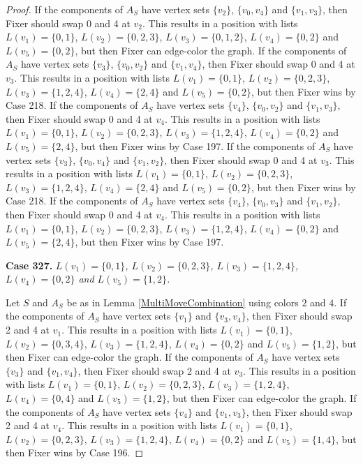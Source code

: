 \documentclass[12pt]{amsart}
\theoremstyle{plain}
\theoremstyle{definition}
\theoremstyle{remark}
\begin{document}
\begin{proof}
If the components of $A_S$ have vertex sets $\{v_2\}$, $\{v_0, v_4\}$ and $\{v_1, v_3\}$, then Fixer should swap 0 and 4 at $v_2$. This results in a position with lists $L(v_1) = \{0, 1\}$, $L(v_2) = \{0, 2, 3\}$, $L(v_3) = \{0, 1, 2\}$, $L(v_4) = \{0, 2\}$ and $L(v_5) = \{0, 2\}$, but then Fixer can edge-color the graph. If the components of $A_S$ have vertex sets $\{v_3\}$, $\{v_0, v_2\}$ and $\{v_1, v_4\}$, then Fixer should swap 0 and 4 at $v_3$. This results in a position with lists $L(v_1) = \{0, 1\}$, $L(v_2) = \{0, 2, 3\}$, $L(v_3) = \{1, 2, 4\}$, $L(v_4) = \{2, 4\}$ and $L(v_5) = \{0, 2\}$, but then Fixer wins by Case 218. If the components of $A_S$ have vertex sets $\{v_4\}$, $\{v_0, v_2\}$ and $\{v_1, v_3\}$, then Fixer should swap 0 and 4 at $v_4$. This results in a position with lists $L(v_1) = \{0, 1\}$, $L(v_2) = \{0, 2, 3\}$, $L(v_3) = \{1, 2, 4\}$, $L(v_4) = \{0, 2\}$ and $L(v_5) = \{2, 4\}$, but then Fixer wins by Case 197. If the components of $A_S$ have vertex sets $\{v_3\}$, $\{v_0, v_4\}$ and $\{v_1, v_2\}$, then Fixer should swap 0 and 4 at $v_3$. This results in a position with lists $L(v_1) = \{0, 1\}$, $L(v_2) = \{0, 2, 3\}$, $L(v_3) = \{1, 2, 4\}$, $L(v_4) = \{2, 4\}$ and $L(v_5) = \{0, 2\}$, but then Fixer wins by Case 218. If the components of $A_S$ have vertex sets $\{v_4\}$, $\{v_0, v_3\}$ and $\{v_1, v_2\}$, then Fixer should swap 0 and 4 at $v_4$. This results in a position with lists $L(v_1) = \{0, 1\}$, $L(v_2) = \{0, 2, 3\}$, $L(v_3) = \{1, 2, 4\}$, $L(v_4) = \{0, 2\}$ and $L(v_5) = \{2, 4\}$, but then Fixer wins by Case 197. 

\noindent\textbf{Case 327.  }\textit{$L(v_1) = \{0, 1\}$, $L(v_2) = \{0, 2, 3\}$, $L(v_3) = \{1, 2, 4\}$, $L(v_4) = \{0, 2\}$ and $L(v_5) = \{1, 2\}$.}

Let $S$ and $A_S$ be as in Lemma \ref{MultiMoveCombination} using colors $2$ and $4$. If the components of $A_S$ have vertex sets $\{v_1\}$ and $\{v_3, v_4\}$, then Fixer should swap 2 and 4 at $v_1$. This results in a position with lists $L(v_1) = \{0, 1\}$, $L(v_2) = \{0, 3, 4\}$, $L(v_3) = \{1, 2, 4\}$, $L(v_4) = \{0, 2\}$ and $L(v_5) = \{1, 2\}$, but then Fixer can edge-color the graph. If the components of $A_S$ have vertex sets $\{v_3\}$ and $\{v_1, v_4\}$, then Fixer should swap 2 and 4 at $v_3$. This results in a position with lists $L(v_1) = \{0, 1\}$, $L(v_2) = \{0, 2, 3\}$, $L(v_3) = \{1, 2, 4\}$, $L(v_4) = \{0, 4\}$ and $L(v_5) = \{1, 2\}$, but then Fixer can edge-color the graph. If the components of $A_S$ have vertex sets $\{v_4\}$ and $\{v_1, v_3\}$, then Fixer should swap 2 and 4 at $v_4$. This results in a position with lists $L(v_1) = \{0, 1\}$, $L(v_2) = \{0, 2, 3\}$, $L(v_3) = \{1, 2, 4\}$, $L(v_4) = \{0, 2\}$ and $L(v_5) = \{1, 4\}$, but then Fixer wins by Case 196. 


\end{proof}
\end{document}
